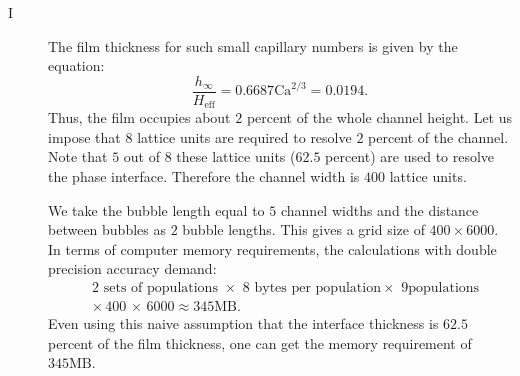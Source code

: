 \documentclass[preprint,12pt]{elsarticle}
\newcommand{\Ca}{\mathrm{Ca}}
\begin{document}
\begin{description}
 \item[I ]
  The film thickness for such small capillary numbers \cite{bretherton} is
given by the equation:
  \begin{equation}
  \frac{h_{\infty}}{H_{\mathrm{eff}}}=0.6687 \Ca^{2/3}=0.0194.
  \end{equation}
Thus, the film
 occupies about $2$ percent of the whole channel height. Let us impose that $8$ lattice
units are required to resolve  $2$ percent of the channel. Note that $5$ out of $8$ these lattice
units
($62.5$ percent) are used to resolve the phase interface. Therefore the channel width is $400$
lattice units.

We take the bubble length equal to $5$ channel widths
  and the distance between bubbles as $2$ bubble lengths. This gives a
grid size of $400 \times 6000$. In terms of computer memory
requirements, the calculations with double precision accuracy demand:
\begin{equation}
\begin{aligned}
&2\text{ sets of populations } \times \,\, 8\,\, \text{bytes per population
} \times \,\, 9 \text{
populations}\\
&\times\,400\,\times\,6000\approx 345 \mathrm{MB}. 
\end{aligned}
\end{equation}
Even using this naive assumption that the interface thickness is $62.5$ percent  of the
film thickness, one can get the memory
requirement of $345 \mathrm{MB}$. 


\end{description}
\end{document}
